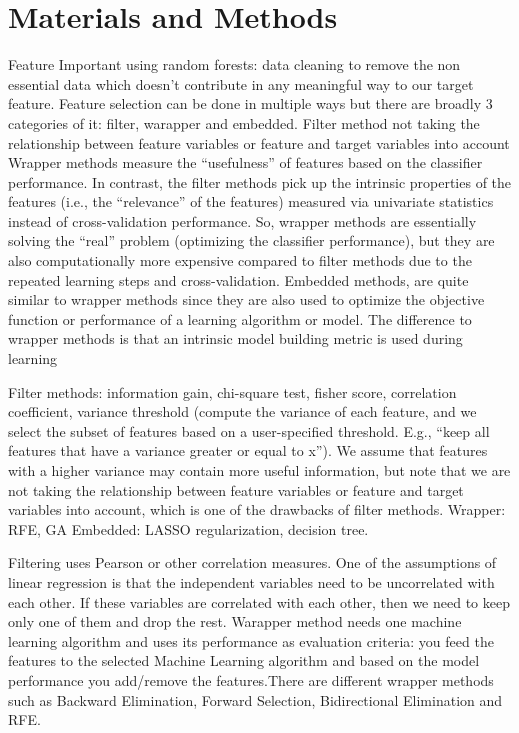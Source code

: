 \documentclass[preprint,12pt]{elsarticle}
\begin{document}
\section{Materials and Methods}
\label{S:2}
Feature Important using random forests: data cleaning to remove the non essential data which doesn’t contribute in any meaningful way to our target feature.
Feature selection can be done in multiple ways but there are broadly 3 categories of it: filter, warapper and embedded. Filter method not taking the relationship between feature variables or feature and target variables into account
Wrapper methods measure the “usefulness” of features based on the classifier performance. In contrast, the filter methods pick up the intrinsic properties of the features (i.e., the “relevance” of the features) measured via univariate statistics instead of cross-validation performance. So, wrapper methods are essentially solving the “real” problem (optimizing the classifier performance), but they are also computationally more expensive compared to filter methods due to the repeated learning steps and cross-validation. Embedded methods, are quite similar to wrapper methods since they are also used to optimize the objective function or performance of a learning algorithm or model. The difference to wrapper methods is that an intrinsic model building metric is used during learning

Filter methods: information gain, chi-square test, fisher score, correlation coefficient, variance threshold (compute the variance of each feature, and we select the subset of features based on a user-specified threshold. E.g., “keep all features that have a variance greater or equal to x”). We assume that features with a higher variance may contain more useful information, but note that we are not taking the relationship between feature variables or feature and target variables into account, which is one of the drawbacks of filter methods.
Wrapper: RFE, GA
Embedded: LASSO regularization, decision tree.


Filtering uses Pearson or other correlation measures.  One of the assumptions of linear regression is that the independent variables need to be uncorrelated with each other. If these variables are correlated with each other, then we need to keep only one of them and drop the rest. 
Warapper method needs one machine learning algorithm and uses its performance as evaluation criteria:  you feed the features to the selected Machine Learning algorithm and based on the model performance you add/remove the features.There are different wrapper methods such as Backward Elimination, Forward Selection, Bidirectional Elimination and RFE.
\end{document}
